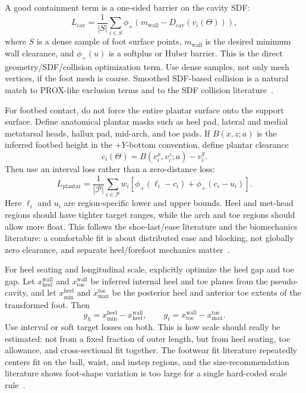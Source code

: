\documentclass[11pt]{article}
\begin{document}
A good containment term is a one-sided barrier on the cavity SDF:
\begin{equation}
L_{\mathrm{cav}} =
\frac{1}{|S|}
\sum_{i\in S}
\phi_+\left(m_{\mathrm{wall}} - D_{\mathrm{cav}}(v_i(\Theta))\right),
\end{equation}
where $S$ is a dense sample of foot surface points, $m_{\mathrm{wall}}$ is the desired minimum wall clearance, and $\phi_+(u)$ is a softplus or Huber barrier. This is the direct geometry/SDF/collision optimization term. Use dense samples, not only mesh vertices, if the foot mesh is coarse. Smoothed SDF-based collision is a natural match to PROX-like exclusion terms and to the SDF collision literature~\cite{prox,sdf-collision}.

For footbed contact, do not force the entire plantar surface onto the support surface. Define anatomical plantar masks such as heel pad, lateral and medial metatarsal heads, hallux pad, mid-arch, and toe pads. If $B(x,z;a)$ is the inferred footbed height in the $+Y$-bottom convention, define plantar clearance
\begin{equation}
c_i(\Theta)=B(v_i^x,v_i^z;a)-v_i^y.
\end{equation}
Then use an interval loss rather than a zero-distance loss:
\begin{equation}
L_{\mathrm{plantar}} =
\frac{1}{|\mathcal{P}|}
\sum_{i\in \mathcal{P}}
w_i
\left[
\phi_+(\ell_i-c_i)
+ \phi_+(c_i-u_i)
\right].
\end{equation}
Here $\ell_i$ and $u_i$ are region-specific lower and upper bounds. Heel and met-head regions should have tighter target ranges, while the arch and toe regions should allow more float. This follows the shoe-last/ease literature and the biomechanics literature: a comfortable fit is about distributed ease and blocking, not globally zero clearance, and separate heel/forefoot mechanics matter~\cite{ease-allowance,toe-spring,rollover}.

For heel seating and longitudinal scale, explicitly optimize the heel gap and toe gap. Let $x^{\mathrm{wall}}_{\mathrm{heel}}$ and $x^{\mathrm{wall}}_{\mathrm{toe}}$ be inferred internal heel and toe planes from the pseudo-cavity, and let $x^{\mathrm{heel}}_{\min}$ and $x^{\mathrm{toe}}_{\max}$ be the posterior heel and anterior toe extents of the transformed foot. Then
\begin{equation}
g_h=x^{\mathrm{heel}}_{\min}-x^{\mathrm{wall}}_{\mathrm{heel}},
\qquad
g_t=x^{\mathrm{wall}}_{\mathrm{toe}}-x^{\mathrm{toe}}_{\max}.
\end{equation}
Use interval or soft target losses on both. This is how scale should really be estimated: not from a fixed fraction of outer length, but from heel seating, toe allowance, and cross-sectional fit together. The footwear fit literature repeatedly centers fit on the ball, waist, and instep regions, and the size-recommendation literature shows foot-shape variation is too large for a single hard-coded scale rule~\cite{fitness-lasts,guess-size}.
\end{document}
